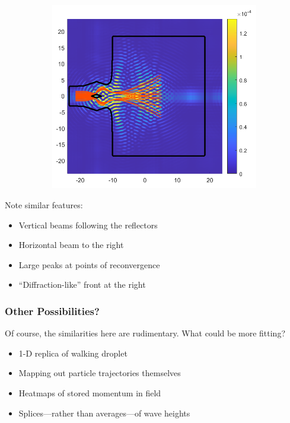\documentclass[compress,10pt,usenames,dvipsnames]{beamer}
\theoremstyle{remark}
\begin{document}
\begin{frame}
\begin{figure}
\begin{subfigure}[t]{.5\textwidth}
		\end{subfigure}%
		\begin{subfigure}[t]{.5\textwidth}
			\centering
			\includegraphics[scale=0.3]{Figures/potential.png}
		\end{subfigure}
	\end{figure}
	\pause
	Note similar features:
	\begin{itemize}
		\item Vertical beams following the reflectors
		\item Horizontal beam to the right
		\item Large peaks at points of reconvergence
		\item ``Diffraction-like'' front at the right
	\end{itemize}
\end{frame}

\begin{frame}\frametitle{Other Possibilities?}
	Of course, the similarities here are rudimentary. What could be more fitting?
	\begin{itemize}
		\item<2-5> 1-D replica of walking droplet
		\item<3-5> Mapping out particle trajectories themselves
		\item<4-5> Heatmaps of stored momentum in field
		\item<5> Splices---rather than averages---of wave heights
	\end{itemize}
\end{frame}
\end{document}
